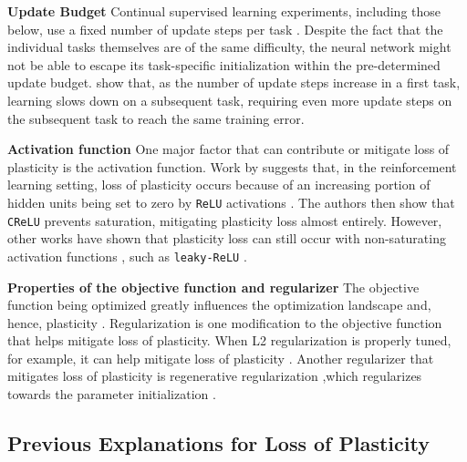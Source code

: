 \documentclass{article}
\begin{document}
  \textbf{Update Budget}\hspace{2mm}
      Continual supervised learning experiments, including those below, use a fixed number of update steps per task \citep[e.g.,][]{abbas23_loss_plast_contin_deep_reinf_learn, elsayed23_utilit_pertur_gradien_descen, javed2019meta}.
      Despite the fact that the individual tasks themselves are of the same difficulty, the neural network might not be able to escape its task-specific initialization within the pre-determined update budget.
        \cite{lyle23_under} show that, as the number of update steps increase in a first task, learning slows down on a subsequent task, requiring even more update steps on the subsequent task to reach the same training error.

  \textbf{Activation function}\hspace{2mm}
        One major factor that can contribute or mitigate loss of plasticity is the activation function.
        Work by \cite{abbas23_loss_plast_contin_deep_reinf_learn} suggests that, in the reinforcement learning setting, loss of plasticity occurs because of an increasing portion of hidden units being set to zero by \texttt{ReLU} activations \citep{fukushima75_cognit,nair10_rectif_linear_units_improv_restr_boltz_machin}.
        The authors then show that \texttt{CReLU} \citep{shang16_under} prevents saturation, mitigating plasticity loss almost entirely.
        However, other works have shown that plasticity loss can still occur with non-saturating activation functions \citep{dohare21_contin_backp, dohare23_maint_plast_deep_contin_learn}, such as \texttt{leaky-ReLU} \citep{xu15_empir}.

  \textbf{Properties of the objective function and regularizer}\hspace{2mm}
        The objective function being optimized greatly influences the optimization landscape and, hence, plasticity \citep{lyle23_under, lyle21_under_preven_capac_loss_reinf_learn,ziyin23_symmet_leads_struc_const_learn}.
        Regularization is one modification to the objective function that helps mitigate loss of plasticity.
        When L2 regularization is properly tuned, for example, it can help mitigate loss of plasticity \citep{dohare23_maint_plast_deep_contin_learn}.
        Another regularizer that mitigates loss of plasticity is regenerative regularization ,which regularizes towards the parameter initialization \citep{kumar23_maint_plast_regen_regul}.

\subsection{Previous Explanations for Loss of Plasticity}
\vspace{-2mm}
\end{document}
